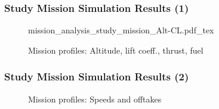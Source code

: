\begin{frame}
 \frametitle{Study Mission Simulation Results (1)}

\hfill

 \begin{figure}
     \tiny
     \def\svgwidth{7cm}
     {mission_analysis_study_mission_Alt-CL.pdf_tex}
     \caption{\scriptsize{Mission profiles: Altitude, lift coeff., thrust, fuel}}
 \end{figure}

\end{frame}

\begin{frame}
 \frametitle{Study Mission Simulation Results (2)}

\hfill

 \begin{figure}[htb]
 \begin{center}
 \hfill
 \end{center}
 \caption{\scriptsize{Mission profiles: Speeds and offtakes}}
 \end{figure}

\end{frame}


